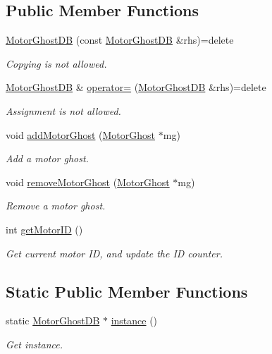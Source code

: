\subsection*{Public Member Functions}
\begin{DoxyCompactItemize}
\item 
\hyperlink{classMotorGhostDB_a3e610587b8c6f79b48d04d6215d8ca5d}{Motor\+Ghost\+D\+B} (const \hyperlink{classMotorGhostDB}{Motor\+Ghost\+D\+B} \&rhs)=delete
\begin{DoxyCompactList}\small\item\em Copying is not allowed. \end{DoxyCompactList}\item 
\hyperlink{classMotorGhostDB}{Motor\+Ghost\+D\+B} \& \hyperlink{classMotorGhostDB_aa2fda20af8075f3b9cce3e06b991ec88}{operator=} (\hyperlink{classMotorGhostDB}{Motor\+Ghost\+D\+B} \&rhs)=delete
\begin{DoxyCompactList}\small\item\em Assignment is not allowed. \end{DoxyCompactList}\item 
void \hyperlink{classMotorGhostDB_ab72c3ce3ac8110f4ba7446e82decb0d1}{add\+Motor\+Ghost} (\hyperlink{classMotorGhost}{Motor\+Ghost} $\ast$mg)
\begin{DoxyCompactList}\small\item\em Add a motor ghost. \end{DoxyCompactList}\item 
void \hyperlink{classMotorGhostDB_a5b6bd5a8bbb407d963ea729c44cd2a90}{remove\+Motor\+Ghost} (\hyperlink{classMotorGhost}{Motor\+Ghost} $\ast$mg)
\begin{DoxyCompactList}\small\item\em Remove a motor ghost. \end{DoxyCompactList}\item 
int \hyperlink{classMotorGhostDB_a1b346aebc03e8d74c7546623cdb6eb40}{get\+Motor\+I\+D} ()
\begin{DoxyCompactList}\small\item\em Get current motor I\+D, and update the I\+D counter. \end{DoxyCompactList}\end{DoxyCompactItemize}
\subsection*{Static Public Member Functions}
\begin{DoxyCompactItemize}
\item 
static \hyperlink{classMotorGhostDB}{Motor\+Ghost\+D\+B} $\ast$ \hyperlink{classMotorGhostDB_a04496d897a1d4dd5bbf99295224938ff}{instance} ()
\begin{DoxyCompactList}\small\item\em Get instance. \end{DoxyCompactList}\end{DoxyCompactItemize}
